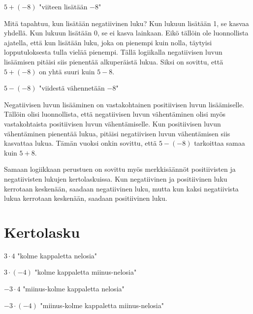     $5+(-8)$ "viiteen lisätään $-8$"
    
    Mitä tapahtuu, kun lisätään negatiivinen luku? Kun lukuun lisätään 1, se
    kasvaa yhdellä. Kun lukuun lisätään 0, se ei kasva lainkaan. Eikö tällöin
    ole luonnollista ajatella, että kun lisätään luku, joka on pienempi kuin
    nolla, täytyisi lopputuloksesta tulla vielää pienempi. Tällä logiikalla
    negatiivisen luvun lisäämisen pitäisi siis pienentää alkuperäistä lukua.
    Siksi on sovittu, että $5+(-8)$ on yhtä suuri kuin $5-8$.
    
    
    $5-(-8)$ "viidestä vähennetään $-8$"
    
    Negatiivisen luvun lisääminen on vastakohtainen positiivisen luvun lisäämiselle.
    Tällöin olisi luonnollista, että negatiivisen luvun vähentäminen olisi myös
    vastakohtaista positiivisen luvun vähentämiselle. Kun positiivisen luvun
    vähentäminen pienentää lukua, pitäisi negatiivisen luvun vähentämisen siis
    kasvattaa lukua. Tämän vuoksi onkin sovittu, että $5-(-8)$ tarkoittaa samaa
    kuin $5+8$.
    
    
    Samaan logiikkaan perustuen on sovittu myös merkkisäännöt positiivisten ja
    negatiivisten lukujen kertolaskuissa. Kun negatiivinen ja positiivinen luku
    kerrotaan keskenään, saadaan negatiivinen luku, mutta kun kaksi negatiivista
    lukua kerrotaan keskenään, saadaan positiivinen luku.

\section{Kertolasku}

    $3 \cdot 4$ "kolme kappaletta nelosia"
    
    
    $3 \cdot (-4)$ "kolme kappaletta miinus-nelosia"
    
    
    $-3 \cdot 4$ "miinus-kolme kappaletta nelosia"
    
    
    $-3 \cdot (-4)$ "miinus-kolme kappaletta miinus-nelosia"
    

